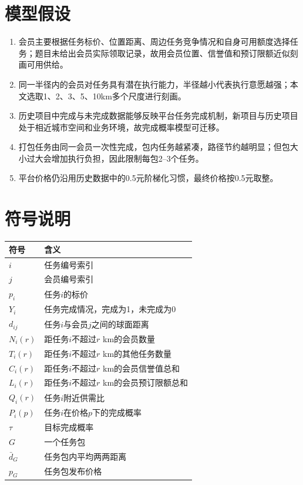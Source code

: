 \documentclass[UTF8,a4paper,12pt]{ctexart}
\begin{document}
\section{模型假设}
\begin{enumerate}[label=H\arabic*]
\item 会员主要根据任务标价、位置距离、周边任务竞争情况和自身可用额度选择任务；题目未给出会员实际领取记录，故用会员位置、信誉值和预订限额近似刻画可用供给。
\item 同一半径内的会员对任务具有潜在执行能力，半径越小代表执行意愿越强；本文选取1、2、3、5、10km多个尺度进行刻画。
\item 历史项目中完成与未完成数据能够反映平台任务完成机制，新项目与历史项目处于相近城市空间和业务环境，故完成概率模型可迁移。
\item 打包任务由同一会员一次性完成，包内任务越紧凑，路径节约越明显；但包大小过大会增加执行负担，因此限制每包2--3个任务。
\item 平台价格仍沿用历史数据中的0.5元阶梯化习惯，最终价格按0.5元取整。
\end{enumerate}

\section{符号说明}
\begin{longtable}{>{\centering\arraybackslash}p{3cm}p{10cm}}
\toprule
符号 & 含义\\
\midrule
$i$ & 任务编号索引\\
$j$ & 会员编号索引\\
$p_i$ & 任务$i$的标价\\
$Y_i$ & 任务完成情况，完成为1，未完成为0\\
$d_{ij}$ & 任务$i$与会员$j$之间的球面距离\\
$N_i(r)$ & 距任务$i$不超过$r$ km的会员数量\\
$T_i(r)$ & 距任务$i$不超过$r$ km的其他任务数量\\
$C_i(r)$ & 距任务$i$不超过$r$ km的会员信誉值总和\\
$L_i(r)$ & 距任务$i$不超过$r$ km的会员预订限额总和\\
$Q_i(r)$ & 任务$i$附近供需比\\
$P_i(p)$ & 任务$i$在价格$p$下的完成概率\\
$\tau$ & 目标完成概率\\
$G$ & 一个任务包\\
$\bar d_G$ & 任务包内平均两两距离\\
$p_G$ & 任务包发布价格\\
\bottomrule
\end{longtable}
\end{document}
